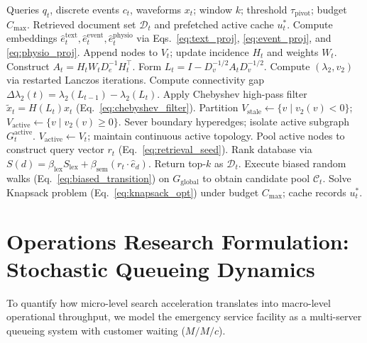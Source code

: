 \documentclass[ijds,dblanonrev]{informs4}
\begin{document}
\begin{algorithm}[t]
\caption{Spectral Diagnostic Trajectories (SDT) Dynamic Engine\label{alg:sdt_engine}}
\begin{algorithmic}[1]
\Require Queries $q_t$, discrete events $c_t$, waveforms $x_t$; window $k$; threshold $\tau_{\text{pivot}}$; budget $C_{\max}$.
\Ensure Retrieved document set $\mathcal{D}_t$ and prefetched active cache $u_t^*$.
\State Compute embeddings $\hat{e}_t^{\text{text}}, \hat{e}_t^{\text{event}}, \hat{e}_t^{\text{physio}}$ via Eqs.~\eqref{eq:text_proj}, \eqref{eq:event_proj}, and \eqref{eq:physio_proj}.
\State Append nodes to $V_t$; update incidence $H_t$ and weights $W_t$. Construct $A_t = H_t W_t D_e^{-1} H_t^\top$.
\State Form $L_t = I - D_v^{-1/2} A_t D_v^{-1/2}$. Compute $(\lambda_2, v_2)$ via restarted Lanczos iterations.
\State Compute connectivity gap $\Delta \lambda_2(t) = \lambda_2(L_{t-1}) - \lambda_2(L_t)$.
 
  \State Apply Chebyshev high-pass filter $\tilde{x}_t = H(L_t) x_t$ (Eq.~\eqref{eq:chebyshev_filter}).
  \State Partition $V_{\text{stale}} \leftarrow \{v \mid v_2(v) < 0\}$; $V_{\text{active}} \leftarrow \{v \mid v_2(v) \ge 0\}$.
  \State Sever boundary hyperedges; isolate active subgraph $G_t^{\text{active}}$.
\Else
  \State $V_{\text{active}} \leftarrow V_t$; maintain continuous active topology.
\EndIf
\State Pool active nodes to construct query vector $r_t$ (Eq.~\eqref{eq:retrieval_seed}).
\State Rank database via $S(d) = \beta_{\text{lex}} S_{\text{lex}} + \beta_{\text{sem}} (r_t \cdot \hat{e}_d)$. Return top-$k$ as $\mathcal{D}_t$.
\State Execute biased random walks (Eq.~\eqref{eq:biased_transition}) on $G_{\text{global}}$ to obtain candidate pool $\mathcal{C}_t$.
\State Solve Knapsack problem (Eq.~\eqref{eq:knapsack_opt}) under budget $C_{\max}$; cache records $u_t^*$.
\end{algorithmic}
\end{algorithm}

\section{Operations Research Formulation: Stochastic Queueing Dynamics}
\label{sec:queueing}

To quantify how micro-level search acceleration translates into macro-level operational throughput, we model the emergency service facility as a multi-server queueing system with customer waiting ($M/M/c$).
\end{document}
